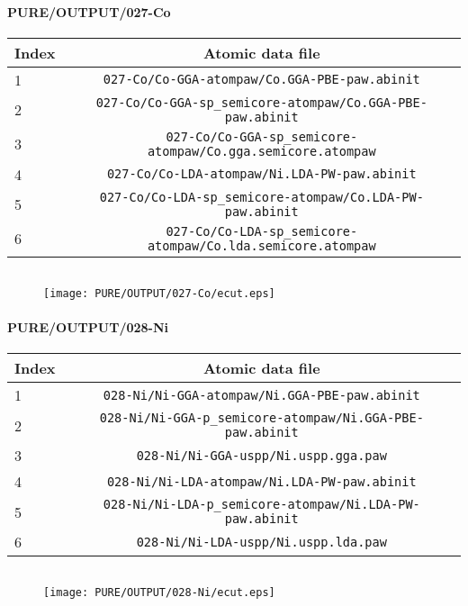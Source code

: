 \documentclass[onecolumn]{revtex4}
\begin{document}
\paragraph*{\bf{PURE/OUTPUT/027-Co}}
\begin{center}
\begin{tabular}{lc}
\hline
Index & Atomic data file \\
\hline
1 & \verb?027-Co/Co-GGA-atompaw/Co.GGA-PBE-paw.abinit?\\
2 & \verb?027-Co/Co-GGA-sp_semicore-atompaw/Co.GGA-PBE-paw.abinit?\\
3 & \verb?027-Co/Co-GGA-sp_semicore-atompaw/Co.gga.semicore.atompaw?\\
4 & \verb?027-Co/Co-LDA-atompaw/Ni.LDA-PW-paw.abinit?\\
5 & \verb?027-Co/Co-LDA-sp_semicore-atompaw/Co.LDA-PW-paw.abinit?\\
6 & \verb?027-Co/Co-LDA-sp_semicore-atompaw/Co.lda.semicore.atompaw?\\
\hline
\end{tabular}
\end{center}
\begin{center}
\begin{tabular}{lccccc}
\hline
\hline
\end{tabular}
\end{center}
\begin{figure}[h] 
\centering 
\texttt{[image: PURE/OUTPUT/027-Co/ecut.eps]}
\end{figure}
\newpage
\paragraph*{\bf{PURE/OUTPUT/028-Ni}}
\begin{center}
\begin{tabular}{lc}
\hline
Index & Atomic data file \\
\hline
1 & \verb?028-Ni/Ni-GGA-atompaw/Ni.GGA-PBE-paw.abinit?\\
2 & \verb?028-Ni/Ni-GGA-p_semicore-atompaw/Ni.GGA-PBE-paw.abinit?\\
3 & \verb?028-Ni/Ni-GGA-uspp/Ni.uspp.gga.paw?\\
4 & \verb?028-Ni/Ni-LDA-atompaw/Ni.LDA-PW-paw.abinit?\\
5 & \verb?028-Ni/Ni-LDA-p_semicore-atompaw/Ni.LDA-PW-paw.abinit?\\
6 & \verb?028-Ni/Ni-LDA-uspp/Ni.uspp.lda.paw?\\
\hline
\end{tabular}
\end{center}
\begin{center}
\begin{tabular}{lccccc}
\hline
\hline
\end{tabular}
\end{center}
\begin{figure}[h] 
\centering 
\texttt{[image: PURE/OUTPUT/028-Ni/ecut.eps]}
\end{figure}
\newpage
\end{document}
